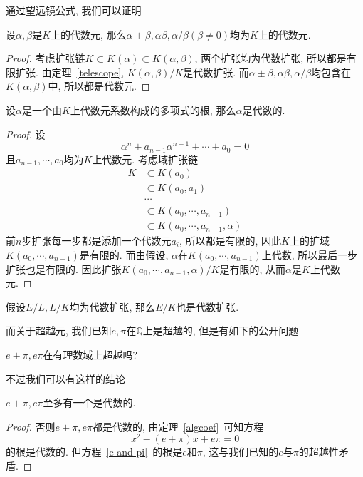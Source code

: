 通过望远镜公式, 我们可以证明
\begin{thm}
    设$\alpha,\beta$是$K$上的代数元, 那么$\alpha\pm\beta,\alpha\beta,\alpha/\beta(\beta\neq 0)$均为$K$上的代数元.
\end{thm}
\begin{proof}
    考虑扩张链$K\subset K(\alpha)\subset K(\alpha,\beta)$, 两个扩张均为代数扩张, 所以都是有限扩张.
    由定理~\ref{telescope}, $K(\alpha,\beta)/K$是代数扩张.
    而$\alpha\pm\beta,\alpha\beta,\alpha/\beta$均包含在$K(\alpha,\beta)$中, 所以都是代数元.
\end{proof}

\begin{thm}\label{algcoef}
    设$\alpha$是一个由$K$上代数元系数构成的多项式的根, 那么$\alpha$是代数的.
\end{thm}
\begin{proof}
    设
    \[\alpha^n+a_{n-1}\alpha^{n-1}+\cdots+a_0=0\]
    且$a_{n-1},\cdots,a_0$均为$K$上代数元.
    考虑域扩张链
    \begin{align*}
        K&\subset K(a_0)\\
        &\subset K(a_0,a_1)\\
        &\cdots\\
        &\subset K(a_0,\cdots,a_{n-1})\\
        &\subset K(a_0,\cdots,a_{n-1},\alpha)
    \end{align*}
    前$n$步扩张每一步都是添加一个代数元$a_i$, 所以都是有限的, 因此$K$上的扩域$K(a_0,\cdots,a_{n-1})$是有限的.
    而由假设, $\alpha$在$K(a_0,\cdots,a_{n-1})$上代数, 所以最后一步扩张也是有限的.
    因此扩张$K(a_0,\cdots,a_{n-1},\alpha)/K$是有限的, 从而$\alpha$是$K$上代数元.
\end{proof}

\begin{col}\label{alg of alg}
    假设$E/L,L/K$均为代数扩张, 那么$E/K$也是代数扩张.
\end{col}

而关于超越元, 我们已知$e,\pi$在$\mathbb{Q}$上是超越的, 但是有如下的公开问题
\begin{pro}
    $e+\pi,e\pi$在有理数域上超越吗?
\end{pro}

不过我们可以有这样的结论
\begin{prop}
    $e+\pi,e\pi$至多有一个是代数的.
\end{prop}
\begin{proof}
    否则$e+\pi,e\pi$都是代数的, 由定理~\ref{algcoef}~可知方程
    \begin{equation}
        x^2-(e+\pi)x+e\pi=0\label{e and pi}
    \end{equation}
    的根是代数的.
    但方程~\eqref{e and pi}~的根是$e$和$\pi$, 这与我们已知的$e$与$\pi$的超越性矛盾.
\end{proof}
